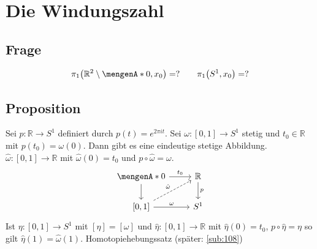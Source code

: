 \section{Die Windungszahl} %
\label{sec:10}
\subsection[Frage nach der Gruppenstruktur von Fundamentalgruppen]{Frage} %
\label{sub:101}
\[
	\pi_1 \enbrace*{\mathds{R}^2 \setminus \set{0}, x_0 } = ? \qquad \pi_1 \enbrace*{S^1, x_0} = ?  
\]

\subsection[Proposition: Hebung eines Weges auf $S^1$ nach $\mathds{R}$]{Proposition} %
\label{sub:102}
Sei $p  : \mathds{R} \to S^1$ definiert durch $p(t) = e^{2 \pi i t}$. Sei $\omega : [0,1] \to S^1$ stetig und $t_0 \in \mathds{R}$ mit $p(t_0) = \omega(0)$.
Dann gibt es eine eindeutige stetige Abbildung. $\hat{\omega} : [0,1] \to \mathds{R}$ mit $\hat{\omega}(0) = t_0$ und $p  \circ  \hat{\omega} = \omega$.
\[
	\begin{tikzcd}
		\set{0} \rar{t_0} \dar& \mathds{R} \dar{p} \\
		{[0,1]} \rar{\omega} \urar[dashed]{\hat{\omega}}& S^1 
	\end{tikzcd}
\]
Ist $\eta : [0,1] \to S^1$ mit $[\eta] = [\omega]$ und $\hat{\eta} : [0,1] \to \mathds{R}$ mit $\hat{\eta}(0)= t_0$, $p \circ \hat{\eta} = \eta$ so gilt 
$\hat{\eta}(1) = \hat{\omega}(1)$.
Homotopiehebungssatz (später: \ref{sub:108}) \bewende

